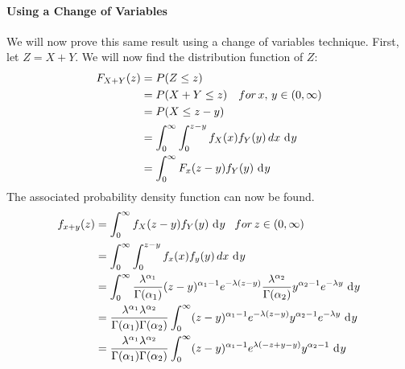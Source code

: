 \documentclass[12pt]{article}
\begin{document}
\paragraph{Using a Change of Variables}
We will now prove this same result using a change of variables technique. First, let $Z = X + Y$. We will now find the
distribution function of $Z$:
\begin{equation}
	\begin{split}
	    F_{X+Y}(z)	&=	P(Z \leq z)\\
	    			&=	P(X+Y \leq z)  \,  \,  \,  \,  \,  \, for \, x, \, y \in (0, \infty)\\
	    			&=	P(X \leq z - y)\\
	    			&=	\int_{0}^{\infty} \int_{0}^{z-y} f_X (x) f_Y (y)\,dx \, \mathop{}\!\mathrm{d^{}}y\\
	    			&=	\int_{0}^{\infty} F_x (z-y) f_Y (y)\, \mathop{}\!\mathrm{d^{}}y\\
    \end{split}
\end{equation}
The associated probability density function can now be found.
\begin{equation}
	\begin{split}
	    f_{x+y}(z)	&=	\int_{0}^{\infty} f_X (z-y) f_Y (y)\, \mathop{}\!\mathrm{d^{}}y \, \, \, \,\, for  \, z \in (0, \infty)\\
	    			&=	\int_{0}^{\infty} \int_{0}^{z-y} f_x (x) f_y (y)\,dx \, \mathop{}\!\mathrm{d^{}}y\\
	    			&=	\int_{0}^{\infty} \frac{\lambda^{\alpha_1}}{\Gamma(\alpha_1)} (z-y)^{\alpha_1 - 1} e^{-\lambda(z-y)}  \frac{\lambda^{\alpha_2}}{\Gamma(\alpha_2)} y^{\alpha_2 - 1} e^{-\lambda y}\, \mathop{}\!\mathrm{d^{}}y\\
	    			&=	\frac{\lambda^{\alpha_1} \lambda^{\alpha_2}}{\Gamma(\alpha_1) \Gamma(\alpha_2)} \int_{0}^{\infty} (z-y)^{\alpha_1 - 1} e^{-\lambda(z-y)} y^{\alpha_2 - 1} e^{-\lambda y}\, \mathop{}\!\mathrm{d^{}}y\\
	    			&=	\frac{\lambda^{\alpha_1} \lambda^{\alpha_2}}{\Gamma(\alpha_1) \Gamma(\alpha_2)} \int_{0}^{\infty} (z-y)^{\alpha_1 - 1} e^{\lambda(-z+y-y)} y^{\alpha_2 - 1} \, \mathop{}\!\mathrm{d^{}}y\\
    \end{split}
\end{equation}
\end{document}

